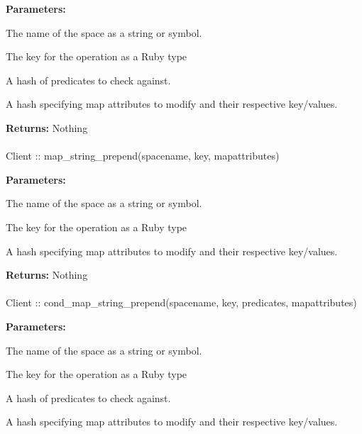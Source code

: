 \noindent\textbf{Parameters:}
\begin{description}[labelindent=\widthof{{mapattributes}},leftmargin=*,noitemsep,nolistsep,align=right]
\item[spacename] The name of the space as a string or symbol.
\item[key] The key for the operation as a Ruby type
\item[predicates] A hash of predicates to check against.
\item[mapattributes] A hash specifying map attributes to modify and their respective key/values.
\end{description}

\noindent\textbf{Returns:}
Nothing

\paragraph{}
\begin{ccode}
Client :: map_string_prepend(spacename, key, mapattributes)
\end{ccode}
\funcdesc 

\noindent\textbf{Parameters:}
\begin{description}[labelindent=\widthof{{mapattributes}},leftmargin=*,noitemsep,nolistsep,align=right]
\item[spacename] The name of the space as a string or symbol.
\item[key] The key for the operation as a Ruby type
\item[mapattributes] A hash specifying map attributes to modify and their respective key/values.
\end{description}

\noindent\textbf{Returns:}
Nothing

\paragraph{}
\begin{ccode}
Client :: cond_map_string_prepend(spacename, key, predicates, mapattributes)
\end{ccode}
\funcdesc 

\noindent\textbf{Parameters:}
\begin{description}[labelindent=\widthof{{mapattributes}},leftmargin=*,noitemsep,nolistsep,align=right]
\item[spacename] The name of the space as a string or symbol.
\item[key] The key for the operation as a Ruby type
\item[predicates] A hash of predicates to check against.
\item[mapattributes] A hash specifying map attributes to modify and their respective key/values.
\end{description}

